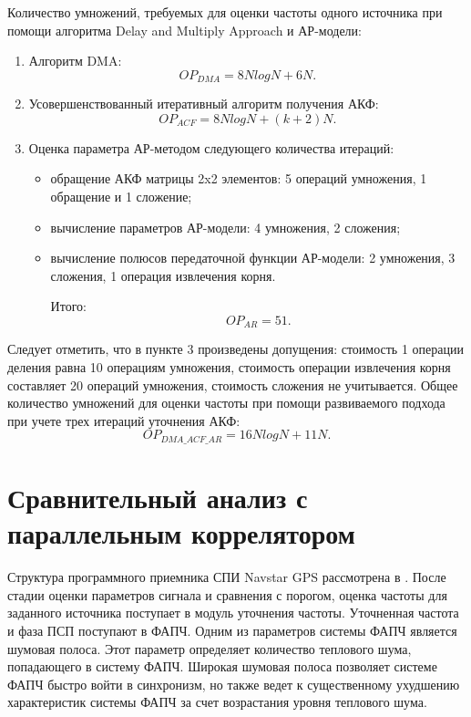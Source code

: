 Количество умножений, требуемых для оценки частоты одного источника при помощи алгоритма Delay and Multiply Approach и АР-модели:
\begin{enumerate}
\item Алгоритм DMA:
	\begin{equation}
		OP_{DMA} = 8NlogN + 6N.
	\end{equation}
\item Усовершенствованный итеративный алгоритм получения АКФ:
	\begin{equation}
		OP_{ACF} = 8NlogN + (k+2)N.
	\end{equation}
\item Оценка параметра АР-методом следующего количества итераций:
	\begin{itemize}
		\item обращение АКФ матрицы 2x2 элементов: 5 операций умножения, 1 обращение и 1 сложение;
		\item вычисление параметров АР-модели: 4 умножения, 2 сложения;
		\item вычисление полюсов передаточной функции АР-модели: 2 умножения, 3 сложения, 1 операция извлечения корня.

			Итого: 
			\begin{equation}
				OP_{AR} = 51.
			\end{equation}
	\end{itemize}
\end{enumerate}

Следует отметить, что в пункте 3 произведены допущения: стоимость 1 операции деления равна 10 операциям умножения, стоимость операции извлечения
корня составляет 20 операций умножения, стоимость сложения не учитывается.
Общее количество умножений для оценки частоты при помощи развиваемого подхода при учете трех итераций уточнения АКФ:
\begin{equation}
	OP_{DMA\_ACF\_AR} = 16NlogN + 11N.
\end{equation}

\section{Сравнительный анализ с параллельным коррелятором}
Структура программного приемника СПИ  Navstar GPS рассмотрена в \cite{tsui}. После стадии оценки параметров сигнала и сравнения с порогом, оценка
частоты для заданного источника поступает в модуль уточнения частоты. Уточненная частота и фаза ПСП поступают в ФАПЧ.
Одним из параметров системы ФАПЧ является шумовая полоса. Этот параметр определяет количество теплового шума, попадающего в систему ФАПЧ.
Широкая шумовая полоса позволяет системе ФАПЧ быстро войти в синхронизм, но также ведет к существенному ухудшению характеристик системы ФАПЧ за счет возрастания уровня теплового шума. 

